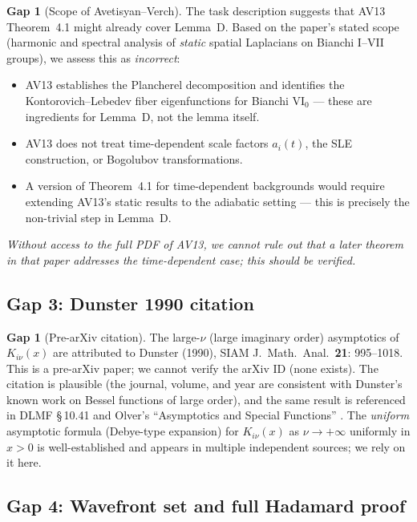 \documentclass[11pt,a4paper]{article}
\theoremstyle{definition}
\newtheorem{gap}[theorem]{Gap}
\begin{document}
\begin{gap}[Scope of Avetisyan--Verch]\label{gap:AV13}
The task description suggests that AV13 \cite{AV13} Theorem~4.1 might already
cover Lemma~D.  Based on the paper's stated scope (harmonic and spectral analysis
of \emph{static} spatial Laplacians on Bianchi I--VII groups), we assess this as
\emph{incorrect}:
\begin{itemize}
  \item AV13 establishes the Plancherel decomposition and identifies the
        Kontorovich--Lebedev fiber eigenfunctions for Bianchi VI$_0$ --- these
        are ingredients for Lemma~D, not the lemma itself.
  \item AV13 does not treat time-dependent scale factors $a_i(t)$,
        the SLE construction, or Bogolubov transformations.
  \item A version of Theorem~4.1 for time-dependent backgrounds would require
        extending AV13's static results to the adiabatic setting --- this is
        precisely the non-trivial step in Lemma~D.
\end{itemize}
\emph{Without access to the full PDF of AV13, we cannot rule out that a later
theorem in that paper addresses the time-dependent case; this should be verified.}
\end{gap}

\subsection{Gap 3: Dunster 1990 citation}

\begin{gap}[Pre-arXiv citation]\label{gap:dunster}
The large-$\nu$ (large imaginary order) asymptotics of $K_{i\nu}(x)$ are attributed
to Dunster (1990), SIAM J.\ Math.\ Anal.\ \textbf{21}: 995--1018.
This is a pre-arXiv paper; we cannot verify the arXiv ID (none exists).
The citation is plausible (the journal, volume, and year are consistent with Dunster's
known work on Bessel functions of large order), and the same result is referenced
in DLMF \S\,10.41 and Olver's ``Asymptotics and Special Functions'' \cite{Olv74}.
The \emph{uniform} asymptotic formula (Debye-type expansion) for $K_{i\nu}(x)$ as
$\nu \to +\infty$ uniformly in $x > 0$ is well-established and appears in multiple
independent sources; we rely on it here.
\end{gap}

\subsection{Gap 4: Wavefront set and full Hadamard proof}
\end{document}
